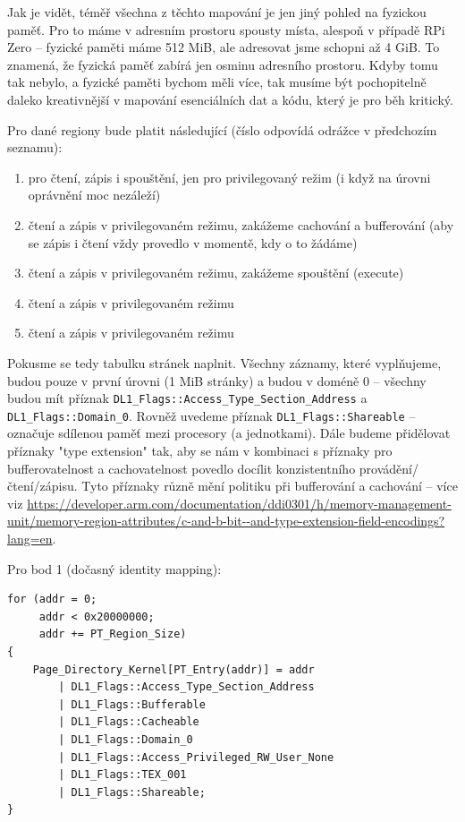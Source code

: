 \documentclass{article}
\begin{document}
Jak je vidět, téměř všechna z těchto mapování je jen jiný pohled na fyzickou paměť. Pro to máme v adresním prostoru spousty místa, alespoň v případě RPi Zero -- fyzické paměti máme 512 MiB, ale adresovat jsme schopni až 4 GiB. To znamená, že fyzická paměť zabírá jen osminu adresního prostoru. Kdyby tomu tak nebylo, a fyzické paměti bychom měli více, tak musíme být pochopitelně daleko kreativnější v mapování esenciálních dat a kódu, který je pro běh kritický.

Pro dané regiony bude platit následující (číslo odpovídá odrážce v předchozím seznamu):
\begin{enumerate}
	\item pro čtení, zápis i spouštění, jen pro privilegovaný režim (i když na úrovni oprávnění moc nezáleží)
	\item čtení a zápis v privilegovaném režimu, zakážeme cachování a bufferování (aby se zápis i čtení vždy provedlo v momentě, kdy o to žádáme)
	\item čtení a zápis v privilegovaném režimu, zakážeme spouštění (execute)
	\item čtení a zápis v privilegovaném režimu
	\item čtení a zápis v privilegovaném režimu
\end{enumerate}

Pokusme se tedy tabulku stránek naplnit. Všechny záznamy, které vyplňujeme, budou pouze v první úrovni (1 MiB stránky) a budou v doméně 0 -- všechny budou mít příznak \texttt{DL1\_Flags::Access\_Type\_Section\_Address} a \texttt{DL1\_Flags::Domain\_0}. Rovněž uvedeme příznak \texttt{DL1\_Flags::Shareable} -- označuje sdílenou paměť mezi procesory (a jednotkami). Dále budeme přidělovat příznaky "type extension" tak, aby se nám v kombinaci s příznaky pro bufferovatelnost a cachovatelnost povedlo docílit konzistentního provádění/čtení/zápisu. Tyto příznaky různě mění politiku při bufferování a cachování -- více viz \url{https://developer.arm.com/documentation/ddi0301/h/memory-management-unit/memory-region-attributes/c-and-b-bit--and-type-extension-field-encodings?lang=en}.

Pro bod 1 (dočasný identity mapping):
\begin{lstlisting}
for (addr = 0;
     addr < 0x20000000;
     addr += PT_Region_Size)
{
    Page_Directory_Kernel[PT_Entry(addr)] = addr
        | DL1_Flags::Access_Type_Section_Address
        | DL1_Flags::Bufferable
        | DL1_Flags::Cacheable
        | DL1_Flags::Domain_0
        | DL1_Flags::Access_Privileged_RW_User_None
        | DL1_Flags::TEX_001
        | DL1_Flags::Shareable;
}
\end{lstlisting}
\end{document}
